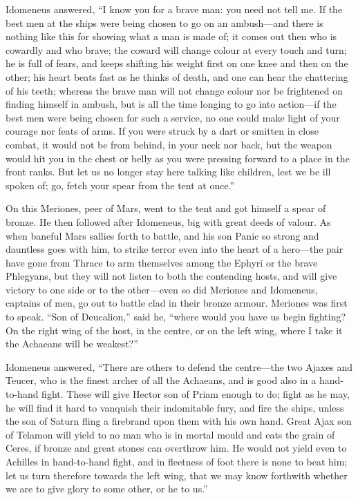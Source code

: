 Idomeneus answered, “I know you for a brave man: you need not tell me. If
the best men at the ships were being chosen to go on an ambush—and
there is nothing like this for showing what a man is made of; it comes out
then who is cowardly and who brave; the coward will change colour at every
touch and turn; he is full of fears, and keeps shifting his weight first
on one knee and then on the other; his heart beats fast as he thinks of
death, and one can hear the chattering of his teeth; whereas the brave man
will not change colour nor be frightened on finding himself in ambush, but
is all the time longing to go into action—if the best men were being
chosen for such a service, no one could make light of your courage nor
feats of arms. If you were struck by a dart or smitten in close combat, it
would not be from behind, in your neck nor back, but the weapon would hit
you in the chest or belly as you were pressing forward to a place in the
front ranks. But let us no longer stay here talking like children, lest we
be ill spoken of; go, fetch your spear from the tent at once.”

On this Meriones, peer of Mars, went to the tent and got himself a spear
of bronze. He then followed after Idomeneus, big with great deeds of
valour. As when baneful Mars sallies forth to battle, and his son Panic so
strong and dauntless goes with him, to strike terror even into the heart
of a hero—the pair have gone from Thrace to arm themselves among the
Ephyri or the brave Phlegyans, but they will not listen to both the
contending hosts, and will give victory to one side or to the other—even
so did Meriones and Idomeneus, captains of men, go out to battle clad in
their bronze armour. Meriones was first to speak. “Son of Deucalion,” said
he, “where would you have us begin fighting? On the right wing of the
host, in the centre, or on the left wing, where I take it the Achaeans
will be weakest?”

Idomeneus answered, “There are others to defend the centre—the two
Ajaxes and Teucer, who is the finest archer of all the Achaeans, and is
good also in a hand-to-hand fight. These will give Hector son of Priam
enough to do; fight as he may, he will find it hard to vanquish their
indomitable fury, and fire the ships, unless the son of Saturn fling a
firebrand upon them with his own hand. Great Ajax son of Telamon will
yield to no man who is in mortal mould and eats the grain of Ceres, if
bronze and great stones can overthrow him. He would not yield even to
Achilles in hand-to-hand fight, and in fleetness of foot there is none to
beat him; let us turn therefore towards the left wing, that we may know
forthwith whether we are to give glory to some other, or he to us.”

